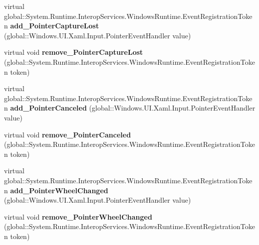 \begin{DoxyCompactItemize}
\mbox{\label{class_windows_1_1_u_i_1_1_xaml_1_1_u_i_element_a66ebc4d8c8c99a7a0364051b341c48a6}} 
virtual global\+::\+System.\+Runtime.\+Interop\+Services.\+Windows\+Runtime.\+Event\+Registration\+Token {\bfseries add\+\_\+\+Pointer\+Capture\+Lost} (global\+::\+Windows.\+U\+I.\+Xaml.\+Input.\+Pointer\+Event\+Handler value)
\item 
\mbox{\label{class_windows_1_1_u_i_1_1_xaml_1_1_u_i_element_a4dc1dfa9d14ef2157a60a0da178c4784}} 
virtual void {\bfseries remove\+\_\+\+Pointer\+Capture\+Lost} (global\+::\+System.\+Runtime.\+Interop\+Services.\+Windows\+Runtime.\+Event\+Registration\+Token token)
\item 
\mbox{\label{class_windows_1_1_u_i_1_1_xaml_1_1_u_i_element_ae4cad3c4c84130d0d6362bc7aed7ba7d}} 
virtual global\+::\+System.\+Runtime.\+Interop\+Services.\+Windows\+Runtime.\+Event\+Registration\+Token {\bfseries add\+\_\+\+Pointer\+Canceled} (global\+::\+Windows.\+U\+I.\+Xaml.\+Input.\+Pointer\+Event\+Handler value)
\item 
\mbox{\label{class_windows_1_1_u_i_1_1_xaml_1_1_u_i_element_a2ce3ea526a5e9942687b9fe640cbdb26}} 
virtual void {\bfseries remove\+\_\+\+Pointer\+Canceled} (global\+::\+System.\+Runtime.\+Interop\+Services.\+Windows\+Runtime.\+Event\+Registration\+Token token)
\item 
\mbox{\label{class_windows_1_1_u_i_1_1_xaml_1_1_u_i_element_a789daf5519a2893ca5d46308010e2bae}} 
virtual global\+::\+System.\+Runtime.\+Interop\+Services.\+Windows\+Runtime.\+Event\+Registration\+Token {\bfseries add\+\_\+\+Pointer\+Wheel\+Changed} (global\+::\+Windows.\+U\+I.\+Xaml.\+Input.\+Pointer\+Event\+Handler value)
\item 
\mbox{\label{class_windows_1_1_u_i_1_1_xaml_1_1_u_i_element_ac3ff4695ca9eb06d618cbf67509cf594}} 
virtual void {\bfseries remove\+\_\+\+Pointer\+Wheel\+Changed} (global\+::\+System.\+Runtime.\+Interop\+Services.\+Windows\+Runtime.\+Event\+Registration\+Token token)
\item 

\end{DoxyCompactItemize}
